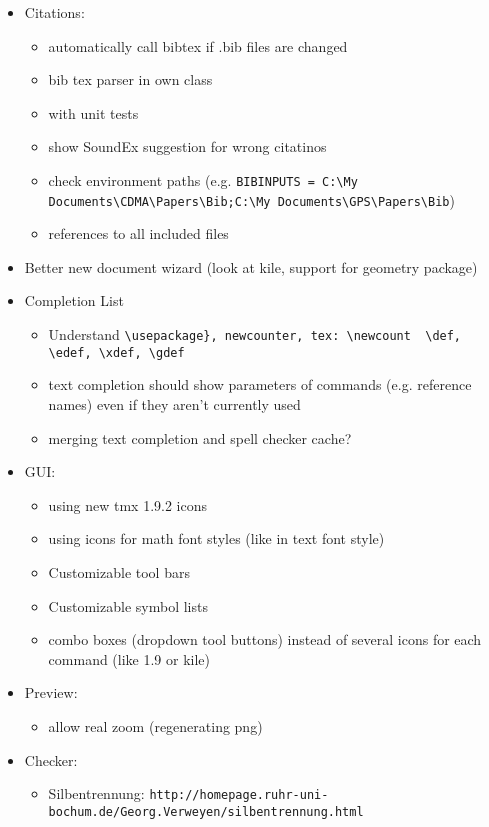 \documentclass[10pt,a4paper,landscape]{report}
\begin{document}
\begin{itemize}
\begin{itemize}
	\end{itemize}
	\item Citations: \begin{itemize}
		\item automatically call bibtex if .bib files are changed
		\item bib tex parser in own class
		\item with unit tests
		\item show SoundEx suggestion for wrong citatinos
		\item check environment paths (e.g. \verb+BIBINPUTS = C:\My Documents\CDMA\Papers\Bib;C:\My Documents\GPS\Papers\Bib+)
		\item references to all included files
	\end{itemize}
	\item Better new document wizard (look at kile, support for geometry package)
	\item Completion List \begin{itemize}
		\item Understand \verb+\usepackage}, newcounter, tex: \newcount  \def, \edef, \xdef, \gdef+
		\item text completion should show parameters of commands (e.g. reference names) even if they aren't currently used
		\item merging text completion and spell checker cache?
	\end{itemize}
	\item GUI: \begin{itemize}
		\item using new tmx 1.9.2 icons
		\item using icons for math font styles (like in text font style)
		\item Customizable tool bars
		\item Customizable symbol lists
		\item combo boxes (dropdown tool buttons) instead of several icons for each command (like 1.9 or kile)
	\end{itemize}
	\item Preview: \begin{itemize}
		\item allow real zoom (regenerating png)
	\end{itemize}
	\item  Checker: \begin{itemize}
		\item Silbentrennung: \verb+http://homepage.ruhr-uni-bochum.de/Georg.Verweyen/silbentrennung.html+

\end{itemize}
\end{itemize}
\end{document}
